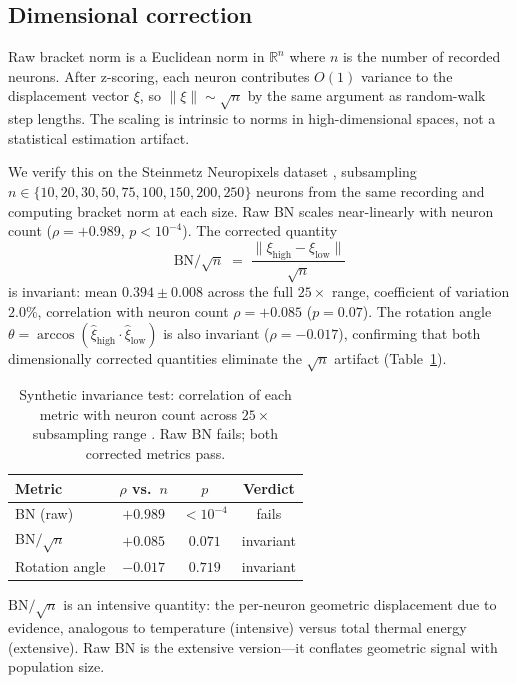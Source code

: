 \documentclass[9pt,lineno]{elife}
\begin{document}
\subsection{Dimensional correction}
\label{sec:dim_correction}

Raw bracket norm is a Euclidean norm in $\mathbb{R}^n$ where $n$ is the number of recorded neurons. After z-scoring, each neuron contributes $O(1)$ variance to the displacement vector $\xi$, so $\lVert \xi \rVert \sim \sqrt{n}$ by the same argument as random-walk step lengths. The scaling is intrinsic to norms in high-dimensional spaces, not a statistical estimation artifact.

We verify this on the Steinmetz Neuropixels dataset \citep{dandi000028}, subsampling $n \in \{10, 20, 30, 50, 75, 100, 150, 200, 250\}$ neurons from the same recording and computing bracket norm at each size. Raw BN scales near-linearly with neuron count ($\rho = +0.989$, $p < 10^{-4}$). The corrected quantity
\begin{equation}
\text{BN}/\!\sqrt{n} \;=\; \frac{\bigl\lVert \xi_{\text{high}} - \xi_{\text{low}} \bigr\rVert}{\sqrt{n}}
\end{equation}
is invariant: mean $0.394 \pm 0.008$ across the full $25\times$ range, coefficient of variation $2.0\%$, correlation with neuron count $\rho = +0.085$ ($p = 0.07$). The rotation angle $\theta = \arccos(\hat{\xi}_{\text{high}} \cdot \hat{\xi}_{\text{low}})$ is also invariant ($\rho = -0.017$), confirming that both dimensionally corrected quantities eliminate the $\sqrt{n}$ artifact (Table~\ref{tab:invariance}).

\begin{table}[t]
\centering
\caption{Synthetic invariance test: correlation of each metric with neuron count across $25\times$ subsampling range \citep{dandi000028}. Raw BN fails; both corrected metrics pass.}
\label{tab:invariance}
\small
\begin{tabular}{lccc}
\toprule
Metric & $\rho$ vs.\ $n$ & $p$ & Verdict \\
\midrule
BN (raw) & $+0.989$ & $<10^{-4}$ & fails \\
BN$/\!\sqrt{n}$ & $+0.085$ & $0.071$ & invariant \\
Rotation angle & $-0.017$ & $0.719$ & invariant \\
\bottomrule
\end{tabular}
\end{table}

$\text{BN}/\!\sqrt{n}$ is an intensive quantity: the per-neuron geometric displacement due to evidence, analogous to temperature (intensive) versus total thermal energy (extensive). Raw BN is the extensive version---it conflates geometric signal with population size.
\end{document}

